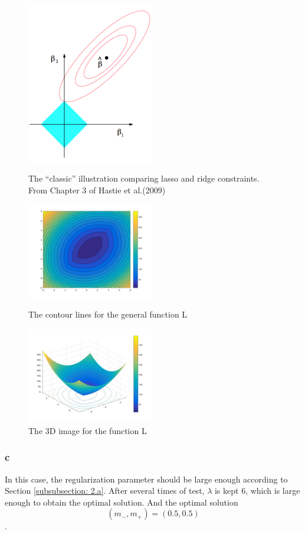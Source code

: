 \documentclass[a4paper]{scrartcl}
\begin{document}
\begin{figure}[!h]
\begin{minipage}[t]{0.33\linewidth}
\centering
\includegraphics[width=2.2in]{norm.png}
\caption{The “classic” illustration comparing lasso and ridge constraints. From Chapter 3 of Hastie et al.(2009)}
\label{fig:norm}
\end{minipage}%
\begin{minipage}[t]{0.33\linewidth}
\centering
\includegraphics[width=2.2in]{q2b.jpg}
\caption{The contour lines for the general function L}
\label{fig:q2b}
\end{minipage}%
\begin{minipage}[t]{0.33\linewidth}
\centering
\includegraphics[width=2.2in]{q2c.jpg}
\caption{The 3D image for the function L}
\label{fig:q2c}
\end{minipage}
\end{figure}

\subsubsection{c}
\label{subsubsec:2.c}
In this case, the regularization parameter should be large enough according to Section \ref{subsubsection: 2.a}. 
After several times of test, $\lambda$ is kept $6$, which is large enough to obtain the optimal solution. And the optimal solution 
$$(m_-, m_+) = (0.5, 0.5)$$.
\end{document}
